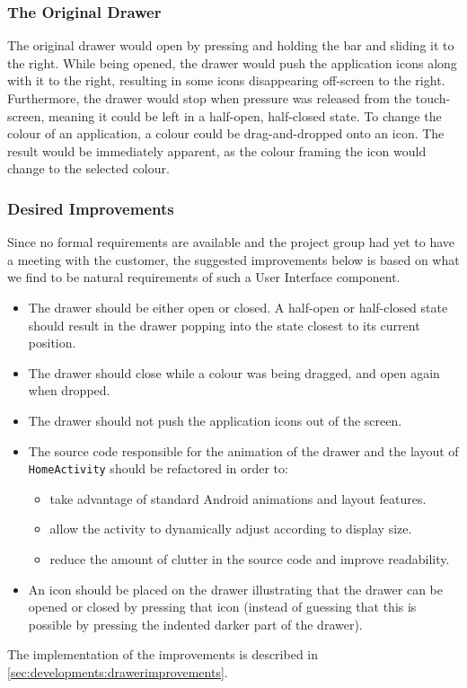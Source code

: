 \subsubsection{The Original Drawer}

The original drawer would open by pressing and holding the bar and sliding it to the right.
While being opened, the drawer would push the application icons along with it to the right, resulting in some icons disappearing off-screen to the right.
Furthermore, the drawer would stop when pressure was released from the touch-screen, meaning it could be left in a half-open, half-closed state.
To change the colour of an application, a colour could be drag-and-dropped onto an icon. 
The result would be immediately apparent, as the colour framing the icon would change to the selected colour.

\subsubsection{Desired Improvements}

Since no formal requirements are available and the project group had yet to have a meeting with the customer, the suggested improvements below is based on what we find to be natural requirements of such a User Interface component. 

\begin{itemize}
\item The drawer should be either open or closed. A half-open or half-closed state should result in the drawer popping into the state closest to its current position.
\item The drawer should close while a colour was being dragged, and open again when dropped.
\item The drawer should not push the application icons out of the screen.
\item The source code responsible for the animation of the drawer and the layout of \lstinline{HomeActivity} should be refactored in order to:
\begin{itemize}
\item take advantage of standard Android animations and layout features.
\item allow the activity to dynamically adjust according to display size.
\item reduce the amount of clutter in the source code and improve readability.
\end{itemize}
\item An icon should be placed on the drawer illustrating that the drawer can be opened or closed by pressing that icon (instead of guessing that this is possible by pressing the indented darker part of the drawer).
\end{itemize}

The implementation of the improvements is described in \cref{sec:developments:drawerimprovements}.